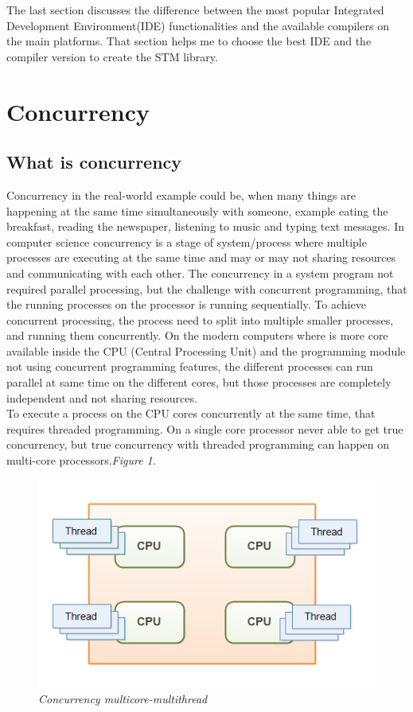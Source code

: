 \documentclass[12pt]{article}
\begin{document}
The last section discusses the difference between the most popular Integrated Development Environment(IDE) functionalities and the available compilers on the main platforms. That section helps me to choose the best IDE and the compiler version to create the STM library.    


\section{Concurrency}
\subsection{What is concurrency}    
Concurrency in the real-world example could be, when many things are happening at the same time simultaneously with someone, example eating the breakfast, reading the newspaper, listening to music and typing text messages. In computer science concurrency is a stage of system/process where multiple processes are executing at the same time and may or may not sharing resources and communicating with each other. The concurrency in a system program not required parallel processing, but the challenge with concurrent programming, that the running processes on the processor is running sequentially. To achieve concurrent processing, the process need to split into multiple smaller processes, and running them concurrently. On the modern computers where is more core available inside the CPU (Central Processing Unit) and the programming module not using concurrent programming features, the different processes can run parallel at same time on the different cores, but those processes are completely independent and not sharing resources.\\ 

To execute a process on the CPU cores concurrently at the same time, that requires threaded programming. On a single core processor never able to get true concurrency, but true concurrency with threaded programming can happen on multi-core processors.\textit{\color{gray}Figure 1.}

\begin{figure}[h!]
\centering
\includegraphics[scale=0.5]{Pictures/Concurrency_multicore-multithreada.png}
\caption{\textit{\color{gray}Concurrency multicore-multithread \cite{Jakob}}}
\end{figure}
\end{document}
